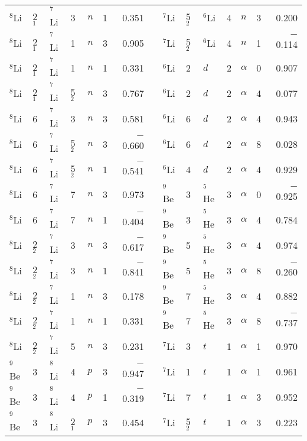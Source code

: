 \documentclass[
12pt, %
oneside, %
english, %
onehalfspacing, %
onehalfspacing, %
headsepline, %
]{MastersDoctoralThesis} %
\begin{document}
\begin{table*}[tp]
\begin{tabular*}{\textwidth}{@{\extracolsep{\fill}}llllllrl@{\extracolsep{\fill}}llllllr@{\extracolsep{\fill}}}
$^8$Li  & 2$_1$  & ${}^7$Li   & 3   & $n$       & 1   & 0.351  &  & ${}^7$Li  & 5$_2$  & ${}^6$Li   & 4   & $n$       & 3   & 0.200     \\
$^8$Li  & 2$_1$  & ${}^7$Li   & 1   & $n$       & 3   & 0.905  &  & ${}^7$Li  & 5$_2$  & ${}^6$Li   & 4   & $n$       & 1   & $-$0.114  \\
$^8$Li  & 2$_1$  & ${}^7$Li   & 1   & $n$       & 1   & 0.331  &  & ${}^6$Li  & 2  & $d$     & 2   & $\alpha$     & 0   & 0.907  \\
$^8$Li  & 2$_1$  & ${}^7$Li   & 5$_2$   & $n$       & 3   & 0.767  &  & ${}^6$Li  & 2  & $d$     & 2   & $\alpha$     & 4   & 0.077   \\
$^8$Li  & 6  & ${}^7$Li   & 3   & $n$       & 3   & 0.581  &  & ${}^6$Li  & 6  & $d$     & 2   & $\alpha$     & 4   & 0.943   \\
$^8$Li  & 6  & ${}^7$Li   & 5$_2$   & $n$       & 3   & $-$0.660  &  & ${}^6$Li  & 6  & $d$     & 2   & $\alpha$     & 8   & 0.028   \\
$^8$Li  & 6  & ${}^7$Li   & 5$_2$   & $n$       & 1   & $-$0.541 &  & ${}^6$Li  & 4  & $d$     & 2   & $\alpha$     & 4   & 0.929   \\
$^8$Li  & 6  & ${}^7$Li   & 7   & $n$       & 3   & 0.973  &  & ${}^9$Be  & 3  & ${}^5$He   & 3   & $\alpha$     & 0   & $-$0.925  \\
$^8$Li  & 6  & ${}^7$Li   & 7   & $n$       & 1   & $-$0.404 &  & ${}^9$Be  & 3  & ${}^5$He   & 3   & $\alpha$     & 4   & 0.784   \\
$^8$Li  & 2$_2$  & ${}^7$Li   & 3   & $n$       & 3   & $-$0.617 &  & ${}^9$Be  & 5  & ${}^5$He   & 3   & $\alpha$     & 4   & 0.974   \\
$^8$Li  & 2$_2$  & ${}^7$Li   & 3   & $n$       & 1   & $-$0.841 &  & ${}^9$Be  & 5  & ${}^5$He   & 3   & $\alpha$     & 8   & $-$0.260   \\
$^8$Li  & 2$_2$  & ${}^7$Li   & 1   & $n$       & 3   & 0.178  &  & ${}^9$Be  & 7  & ${}^5$He   & 3   & $\alpha$     & 4   & 0.882   \\
$^8$Li  & 2$_2$  & ${}^7$Li   & 1   & $n$       & 1   & 0.331  &  & ${}^9$Be  & 7  & ${}^5$He   & 3   & $\alpha$     & 8   & $-$0.737  \\
$^8$Li  & 2$_2$  & ${}^7$Li   & 5   & $n$       & 3   & 0.231  &  & ${}^7$Li  & 3  & $t$     & 1   & $\alpha$     & 1   & 0.970       \\
$^9$Be  & 3  & ${}^8$Li    & 4   & $p$       & 3   & $-$0.947 &  & ${}^7$Li  & 1  & $t$     & 1   & $\alpha$     & 1   & 0.961       \\
$^9$Be  & 3  & ${}^8$Li    & 4   & $p$       & 1   & $-$0.319 &  & ${}^7$Li  & 7  & $t$     & 1   & $\alpha$     & 3   & 0.952       \\
$^9$Be  & 3  & ${}^8$Li    & 2$_1$   & $p$       & 3   & 0.454  &  & ${}^7$Li  & 5$_2$  & $t$     & 1   & $\alpha$     & 3   & 0.223  \\
\bottomrule
\end{tabular*}
\end{table*}
\end{document}
